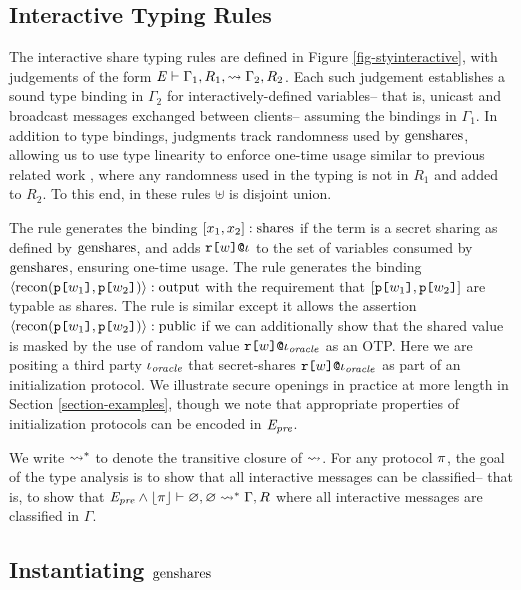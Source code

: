 \subsection{Interactive Typing Rules} 

The interactive share typing rules are defined in Figure
\ref{fig-styinteractive}, with judgements of the form $\mathit{E} \vdash
\Gamma_1,R_1, \leadsto \Gamma_2,R_2$.  Each such judgement establishes
a sound type binding in $\Gamma_2$ for interactively-defined
variables-- that is, unicast and broadcast messages exchanged between
clients-- assuming the bindings in $\Gamma_1$. In addition to type
bindings, judgments track randomness used by $\mathrm{genshares}$, allowing us
to use type linearity to enforce one-time usage similar to previous
related work \cite{darais2019language}, where any randomness used in
the typing is not in $R_1$ and added to $R_2$. To this end, in these
rules $\uplus$ is disjoint union.

The  rule generates the binding $[x_1,
  x_2] : \mathrm{shares}$ if the term is a secret sharing as defined
by $\mathrm{genshares}$, and adds $\texttt{r[}w\texttt{]}\texttt{@}\iota$ to the set of variables
consumed by $\mathrm{genshares}$, ensuring one-time usage. The
 rule generates the binding $\langle \mathrm{recon}(\texttt{p[}w_1\texttt{]},\texttt{p[}w_2\texttt{]}) \rangle :
\mathrm{output}$ with the requirement that $[\texttt{p[}w_1\texttt{]},\texttt{p[}w_2\texttt{]}]$ are typable as
shares. The  rule is similar except it allows the
assertion $\langle \mathrm{recon}(\texttt{p[}w_1\texttt{]},\texttt{p[}w_2\texttt{]}) \rangle : \mathrm{public}$ if we can additionally
show that the shared value is masked by the use of random value
$\texttt{r[}w\texttt{]}\texttt{@}\iota_{\mathit{oracle}}$ as an OTP. Here we are positing a third party $\iota_{\mathit{oracle}}$
that secret-shares $\texttt{r[}w\texttt{]}\texttt{@}\iota_{\mathit{oracle}}$ as part of an initialization
protocol. We illustrate secure openings in practice at more length
in Section \ref{section-examples}, though we note that appropriate
properties of initialization protocols can be encoded in $\mathit{E}_{\mathit{pre}}$.

We write $\leadsto^*$ to denote the transitive
closure of $\leadsto$. For any protocol $\pi$, the goal of the
type analysis is to show that all interactive messages can be classified--
that is, to show that $\mathit{E}_{\mathit{pre}} \wedge \lfloor \pi \rfloor \vdash
\varnothing,\varnothing \leadsto^* \Gamma,R$ where all
interactive messages are classified in $\Gamma$. 

\styinteractivefig

\subsection{Instantiating $\mathrm{genshares}$}

